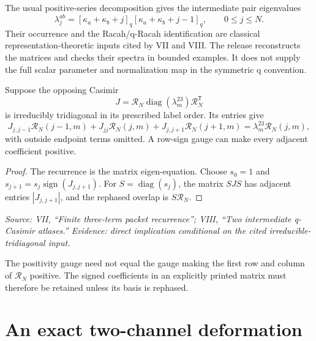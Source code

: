 The usual positive-series decomposition gives the intermediate pair eigenvalues
\[
\lambda_j^{ab}=[\kappa_a+\kappa_b+j]_q
[\kappa_a+\kappa_b+j-1]_q,\qquad 0\leq j\leq N.
\]
Their occurrence and the Racah/q-Racah identification are classical representation-theoretic inputs cited by VII and VIII. The release reconstructs the matrices and checks their spectra in bounded examples. It does not supply the full scalar parameter and normalization map in the symmetric q convention.

\begin{proposition}
Suppose the opposing Casimir
\[
J=\mathcal R_N\operatorname{diag}(\lambda_m^{23})\mathcal R_N^{\mathsf T}
\]
is irreducibly tridiagonal in its prescribed label order. Its entries give
\[
J_{j,j-1}\mathcal R_N(j-1,m)+J_{jj}\mathcal R_N(j,m)
+J_{j,j+1}\mathcal R_N(j+1,m)
=\lambda_m^{23}\mathcal R_N(j,m),
\]
with outside endpoint terms omitted. A row-sign gauge can make every adjacent coefficient positive.
\end{proposition}

\begin{proof}
The recurrence is the matrix eigen-equation. Choose $s_0=1$ and $s_{j+1}=s_j\operatorname{sign}(J_{j,j+1})$. For $S=\operatorname{diag}(s_j)$, the matrix $SJS$ has adjacent entries $|J_{j,j+1}|$, and the rephased overlap is $S\mathcal R_N$.
\end{proof}

\noindent\emph{Source: VII, ``Finite three-term packet recurrence''; VIII, ``Two intermediate q-Casimir atlases.'' Evidence: direct implication conditional on the cited irreducible-tridiagonal input.}

The positivity gauge need not equal the gauge making the first row and column of $\mathcal R_N$ positive. The signed coefficients in an explicitly printed matrix must therefore be retained unless its basis is rephased.

\section{An exact two-channel deformation}

